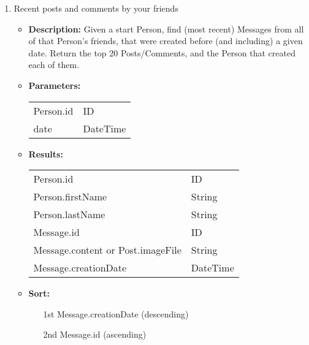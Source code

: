 {\begin{enumerate}
                \item Recent posts and comments by your friends
                    \begin{itemize}
                        \item \textbf{Description:}
                          Given a start Person, find (most recent) Messages from
                            all of that Person's friends, that were created before (and
                            including) a given date.  Return the top 20 Posts/Comments, and the
                            Person that created each of them.  			
                        \item \textbf{Parameters:} \\
                            \begin{tabular}{ll}
                                Person.id 										& ID \\
                                date 											& DateTime \\
                            \end{tabular}
                        \item \textbf{Results:} \\
                            \begin{tabular}{ll}
                                Person.id 										& ID \\
                                Person.firstName								& String \\
                                Person.lastName									& String \\
                                Message.id 								& ID \\
                                Message.content or Post.imageFile 	& String \\
                                Message.creationDate	& DateTime \\
                            \end{tabular}		
                        \item \textbf{Sort:}
                          \begin{itemize}
                            \item[1st] Message.creationDate (descending)
                            \item[2nd] Message.id (ascending)
                          \end{itemize}
                    \end{itemize}


\end{enumerate}}
